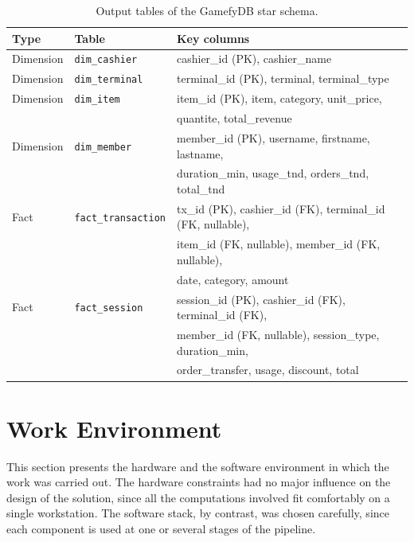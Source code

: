 \documentclass[12pt, a4paper]{report}
\begin{document}
\begin{table}[H]
  \centering
  \caption{Output tables of the GamefyDB star schema.\label{tab:star_schema}}
  \begin{tabular}{lll}
    \toprule
    \textbf{Type} & \textbf{Table} & \textbf{Key columns} \\
    \midrule
    Dimension & \texttt{dim\_cashier}  & cashier\_id (PK), cashier\_name \\
    Dimension & \texttt{dim\_terminal} & terminal\_id (PK), terminal, terminal\_type \\
    Dimension & \texttt{dim\_item}     & item\_id (PK), item, category, unit\_price, \\
              &                        & quantite, total\_revenue \\
    Dimension & \texttt{dim\_member}   & member\_id (PK), username, firstname, lastname, \\
              &                        & duration\_min, usage\_tnd, orders\_tnd, total\_tnd \\
    \midrule
    Fact & \texttt{fact\_transaction} & tx\_id (PK), cashier\_id (FK),
                                        terminal\_id (FK, nullable), \\
         &                            & item\_id (FK, nullable),
                                        member\_id (FK, nullable), \\
         &                            & date, category, amount \\
    Fact & \texttt{fact\_session}     & session\_id (PK), cashier\_id (FK),
                                        terminal\_id (FK), \\
         &                            & member\_id (FK, nullable),
                                        session\_type, duration\_min, \\
         &                            & order\_transfer, usage, discount, total \\
    \bottomrule
  \end{tabular}
\end{table}

\section{Work Environment}

This section presents the hardware and the software environment in which
the work was carried out. The hardware constraints had no major influence
on the design of the solution, since all the computations involved fit
comfortably on a single workstation. The software stack, by contrast, was
chosen carefully, since each component is used at one or several stages of
the pipeline.
\end{document}
